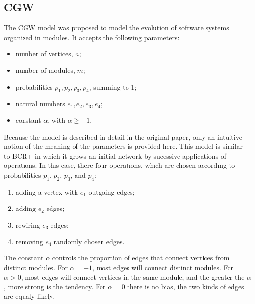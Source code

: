 
\subsection{CGW}

The CGW model \cite{Chen2008} was proposed to model the evolution of software
systems organized in modules. It accepts the following parameters:

\begin{itemize}
\item number of vertices, $n$;
\item number of modules, $m$;
\item probabilities $p_1, p_2, p_3, p_4$, summing to 1;
\item natural numbers $e_1, e_2, e_3, e_4$;
\item constant $\alpha$, with $\alpha \ge -1$.
\end{itemize}

Because the model is described in detail in the original paper, only an
intuitive notion of the meaning of the parameters is provided here. This model
is similar to BCR+ in which it grows an initial network by sucessive
applications of operations. In this case, there four operations, which are
chosen according to probabilities $p_1$, $p_2$, $p_3$, and $p_4$: 

\begin{enumerate}
\item adding a vertex with $e_1$ outgoing edges; 
\item adding $e_2$ edges;
\item rewiring $e_3$ edges;
\item removing $e_4$ randomly chosen edges.
\end{enumerate}

The constant $\alpha$ controls the proportion of edges that connect vertices
from distinct modules. For $\alpha = -1$, most edges will connect distinct
modules. For $\alpha > 0$, most edges will connect vertices in the same module,
and the greater the $\alpha$, more strong is the tendency. For $\alpha = 0$
there is no bias, the two kinds of edges are equaly likely.



